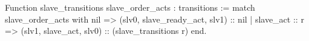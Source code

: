 Function slave_transitions slave_order_acts : transitions :=
 match slave_order_acts with
   nil            => (slv0, slave_ready_act, slv1) :: nil
 | slave_act :: r => (slv1, slave_act, slv0) :: (slave_transitions r)
  end.